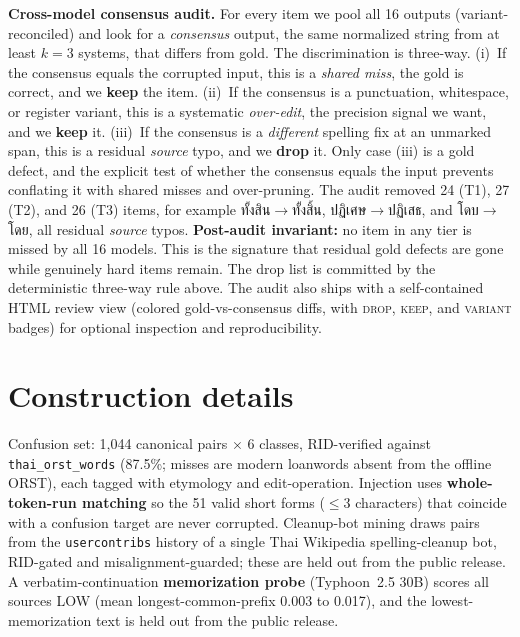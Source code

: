 \documentclass[11pt]{article}
\begin{document}
\textbf{Cross-model consensus audit.} For every item we pool all 16 outputs
(variant-reconciled) and look for a \emph{consensus} output, the same normalized string from
at least $k{=}3$ systems, that differs from gold. The discrimination is three-way.
(i)~If the consensus equals the corrupted input, this is a \emph{shared miss}, the gold is
correct, and we \textbf{keep} the item.
(ii)~If the consensus is a punctuation, whitespace, or register variant, this is a systematic
\emph{over-edit}, the precision signal we want, and we \textbf{keep} it.
(iii)~If the consensus is a \emph{different} spelling fix at an unmarked span, this is a
residual \emph{source} typo, and we \textbf{drop} it. Only case (iii) is a gold defect, and
the explicit test of whether the consensus equals the input prevents conflating it with shared
misses and over-pruning. The audit removed 24 (T1), 27 (T2), and 26 (T3) items, for example
ทั้งสิน$\to$ทั้งสิ้น, ปฏิเศษ$\to$ปฏิเสธ, and โดบ$\to$โดย, all residual \emph{source} typos.
\textbf{Post-audit invariant:} no item in any tier is missed by all 16 models. This is the
signature that residual gold defects are gone while genuinely hard items remain. The drop list
is committed by the deterministic three-way rule above. The audit also ships with a
self-contained HTML review view (colored gold-vs-consensus diffs, with \textsc{drop},
\textsc{keep}, and \textsc{variant} badges) for optional inspection and reproducibility.

\section{Construction details}
\label{app:construction}
Confusion set: 1{,}044 canonical pairs $\times$ 6 classes, RID-verified against
\texttt{thai\_orst\_words} (87.5\%; misses are modern loanwords absent from the offline ORST),
each tagged with etymology and edit-operation. Injection uses \textbf{whole-token-run matching}
so the 51 valid short forms ($\le 3$ characters) that coincide with a confusion target are
never corrupted. Cleanup-bot mining draws pairs from the \texttt{usercontribs} history of a
single Thai Wikipedia spelling-cleanup bot, RID-gated and misalignment-guarded; these are held
out from the public release. A verbatim-continuation \textbf{memorization probe} (Typhoon~2.5
30B) scores all sources LOW (mean longest-common-prefix 0.003 to 0.017), and the
lowest-memorization text is held out from the public release.
\end{document}
